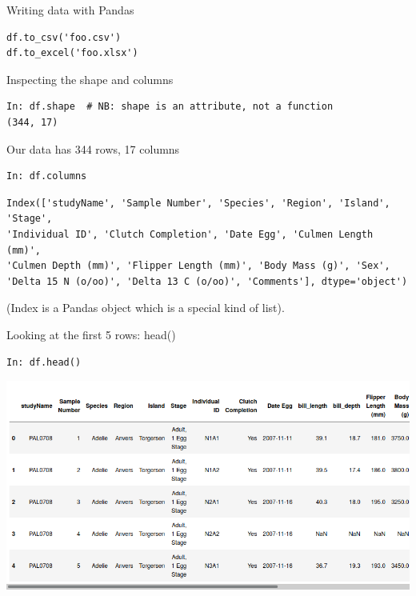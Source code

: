 \documentclass[aspectratio=169,usenames,dvipsnames]{beamer}
\begin{document}
\begin{frame}[fragile]{Writing data with Pandas}
\begin{lstlisting}
df.to_csv('foo.csv')
df.to_excel('foo.xlsx')
\end{lstlisting}
\end{frame}



\begin{frame}[fragile]{Inspecting the shape and columns}
\begin{lstlisting}
In: df.shape  # NB: shape is an attribute, not a function
(344, 17)
\end{lstlisting}

Our data has 344 rows, 17 columns
\pause

\begin{lstlisting}
In: df.columns
\end{lstlisting}
\vspace{-1em}
\begin{lstlisting}[style=plain]
Index(['studyName', 'Sample Number', 'Species', 'Region', 'Island', 'Stage',
'Individual ID', 'Clutch Completion', 'Date Egg', 'Culmen Length (mm)',
'Culmen Depth (mm)', 'Flipper Length (mm)', 'Body Mass (g)', 'Sex',
'Delta 15 N (o/oo)', 'Delta 13 C (o/oo)', 'Comments'], dtype='object')
\end{lstlisting}
(Index is a Pandas object which is a special kind of list).
\end{frame}

\begin{frame}[fragile]{Looking at the first 5 rows: head()}
\vspace{-0.5em}
\begin{lstlisting}
In: df.head()
\end{lstlisting}

\vspace{-1em}
\includegraphics[height=0.8\textheight]{fig/penguinshead}
\end{frame}
\end{document}
